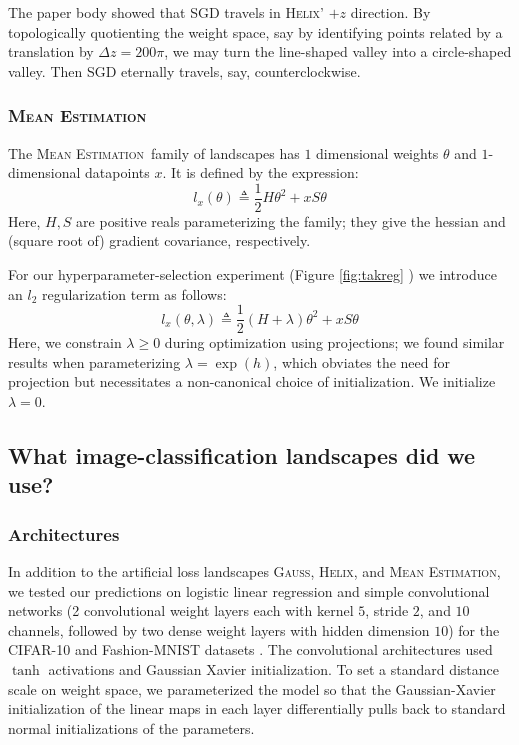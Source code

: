 \documentclass[anon,12pt]{colt2021} %
\newcommand{\ofthree}[1]{
    {\tiny \raisebox{0.04cm}{$
        \ifthenelse{\equal{#1}{0}}{{\color{moor}\blacksquare}}{\square}
        \ifthenelse{\equal{#1}{1}}{{\color{moor}\blacksquare}}{\square}    
        \ifthenelse{\equal{#1}{2}}{{\color{moor}\blacksquare}}{\square}
    $}}%
}
\newcommand{\Gauss}{\textsc{Gauss}}
\newcommand{\Helix}{\textsc{Helix}}
\newcommand{\MeanEstimation}{\textsc{Mean Estimation}}
\begin{document}
            The paper body showed that SGD travels in \Helix' $+z$
            direction.  By topologically quotienting the weight space, say by
            identifying points related by a translation by $\Delta z = 200\pi$,
            we may turn the line-shaped valley into a circle-shaped valley.
            Then SGD eternally travels, say, counterclockwise.
           
        \subsubsection{\MeanEstimation}
            The \MeanEstimation\, family of landscapes has $1$ dimensional
            weights $\theta$ and $1$-dimensional datapoints $x$.  It is defined
            by the expression:
            $$
                l_x(\theta)
                \triangleq
                \frac{1}{2} H \theta^2 + x S \theta
            $$
            Here, $H, S$ are positive reals parameterizing the family; they
            give the hessian and (square root of) gradient covariance,
            respectively.

            For our hyperparameter-selection experiment (Figure
            \ref{fig:takreg}\ofthree{2}) we introduce an $l_2$
            regularization term as follows:
            $$
                l_x(\theta, \lambda)
                \triangleq
                \frac{1}{2} (H + \lambda) \theta^2 + x S \theta
            $$
            Here, we constrain $\lambda\geq 0$ during optimization using
            projections; we found similar results when parameterizing $\lambda
            = \exp(h)$, which obviates the need for projection but necessitates
            a non-canonical choice of initialization.  We initialize
            $\lambda=0$.

    \subsection{What image-classification landscapes did we use?}   \label{appendix:natural}

        \subsubsection{Architectures}
            In addition to the artificial loss landscapes
            \Gauss, \Helix, and \MeanEstimation, 
            we tested our predictions on logistic linear regression
            and simple convolutional networks (2 convolutional weight layers
            each with kernel $5$, stride $2$, and $10$ channels, followed by
            two dense weight layers with hidden dimension $10$) for the
            CIFAR-10 \cite{kr09} and Fashion-MNIST datasets \cite{xi17}.  The
            convolutional architectures used $\tanh$ activations and Gaussian
            Xavier initialization.  To set a standard distance scale on weight
            space, we parameterized the model so that the
            Gaussian-Xavier initialization of the linear maps in each layer
            differentially pulls back to standard normal initializations of the
            parameters.
            
\end{document}
